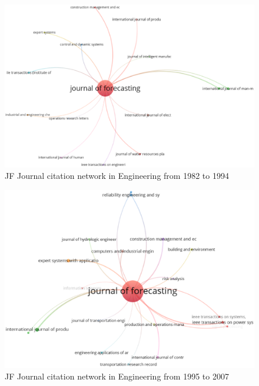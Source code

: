\documentclass[11pt,a4paper]{elsarticle} %
\begin{document}
\begin{figure}[htbp]
\centering
\includegraphics[scale=0.3]{fig.26.eps}
\caption{JF Journal citation network in Engineering from 1982 to 1994}
\end{figure}

\begin{figure}[htbp]
\centering
\includegraphics[scale=0.3]{fig.27.eps}
\caption{JF Journal citation network in Engineering from 1995 to 2007}
\end{figure}
\end{document}
